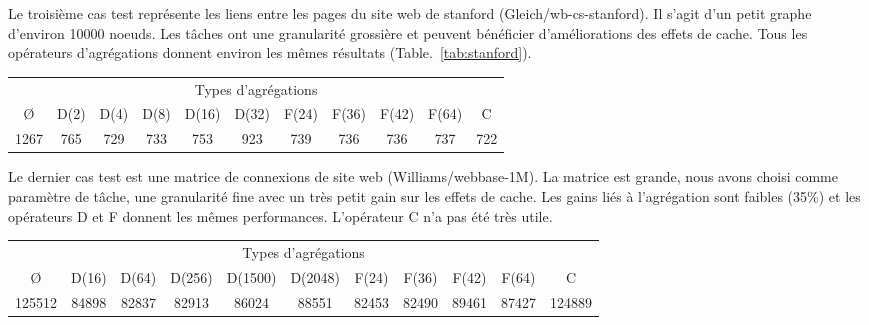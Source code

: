 Le troisième cas test représente les liens entre les pages du site web de stanford (Gleich/wb-cs-stanford).
%
Il s'agit d'un petit graphe d'environ 10000 noeuds.
%
Les tâches ont une granularité grossière et peuvent bénéficier d'améliorations des effets de cache.
%
Tous les opérateurs d'agrégations donnent environ les mêmes résultats (Table.~\ref{tab:stanford}).


\begin{center}
  \begin{tabular}{|c|c|c|c|c|c|c|c|c|c|c|}
    \hline
    \multicolumn{11}{|c|}{Types d'agrégations}\\
    \O & D(2) & D(4) & D(8) & D(16) & D(32) & F(24) & F(36) & F(42) & F(64) & C \\
    \hline
    1267 & 765 & 729 & 733 & 753 & 923 & 739 & 736 & 736 & 737 & 722 \\
    \hline
  \end{tabular}
  \label{tab:stanford}
\end{center}


Le dernier cas test est une matrice de connexions de site web (Williams/webbase-1M).
%
La matrice est grande, nous avons choisi comme paramètre de tâche, une granularité fine avec un très petit gain sur les effets de cache.
%
Les gains liés à l'agrégation sont faibles (35\%) et les opérateurs D et F donnent les mêmes performances.
%
L'opérateur C n'a pas été très utile.


\begin{center}
  \begin{tabular}{|c|c|c|c|c|c|c|c|c|c|c|}
    \hline
    \multicolumn{11}{|c|}{Types d'agrégations}\\
    \O & D(16) & D(64) & D(256) & D(1500) & D(2048) & F(24) & F(36) & F(42) & F(64) & C \\
    \hline
    125512 & 84898 & 82837 & 82913 & 86024 & 88551 & 82453 & 82490 & 89461 & 87427 & 124889 \\
    \hline
  \end{tabular}
  \label{tab:webbase}
\end{center}

